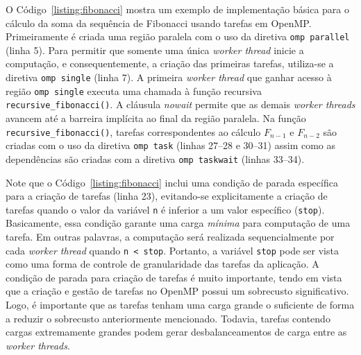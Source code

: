 \documentclass{SBCbookchapter}
\begin{document}
	O Código~\ref{listing:fibonacci} mostra um exemplo de implementação básica para o cálculo da soma da sequência
	de Fibonacci usando tarefas em OpenMP. Primeiramente é criada uma região paralela com o uso da diretiva
	\texttt{omp parallel} (linha 5). Para permitir que somente uma única \textit{worker thread} inicie a computação, e
	consequentemente, a criação das primeiras tarefas, utiliza-se a diretiva \texttt{omp single} (linha 7). A primeira
	\textit{worker thread} que ganhar acesso à região \texttt{omp single} executa uma chamada à função recursiva 
	\texttt{recursive\_fibonacci()}. A cláusula \textit{nowait} permite que as demais \textit{worker threads} avancem até
	a barreira implícita ao final da região paralela. Na função \texttt{recursive\_fibonacci()}, tarefas correspondentes ao
	cálculo $F_{n-1}$ e $F_{n-2}$ são criadas com o uso da diretiva \texttt{omp task} (linhas 27--28 e 30--31) assim
	como as dependências são criadas com a diretiva \texttt{omp taskwait} (linhas 33--34).
	
	Note que o Código~\ref{listing:fibonacci} inclui uma condição de parada específica para a criação de tarefas (linha 23),
	evitando-se explicitamente a criação de tarefas quando o valor da variável \texttt{n} é inferior a um valor específico (\texttt{stop}). 
	Basicamente, essa condição garante uma carga \textit{mínima} para computação de uma tarefa. Em outras palavras, a
	computação será realizada sequencialmente por cada \textit{worker thread} quando \texttt{n < stop}. Portanto,
	a variável \texttt{stop} pode ser vista como uma forma de controle de granularidade das tarefas da aplicação.
	A condição de parada para criação de tarefas é muito importante, tendo em vista que a criação e gestão de tarefas no
	OpenMP possui um sobrecusto significativo. Logo, é importante que as tarefas tenham uma carga grande o suficiente de forma
	a reduzir o sobrecusto anteriormente mencionado. Todavia, tarefas contendo cargas extremamente grandes podem gerar
	desbalanceamentos de carga entre as \textit{worker threads}.
\end{document}
